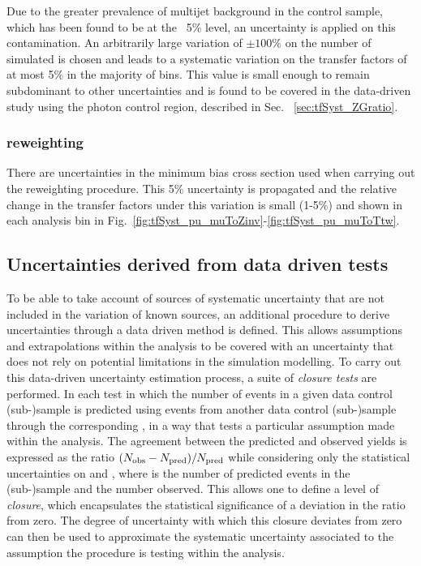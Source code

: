 Due to the greater prevalence of \QCD multijet background in the \gj
control sample, which has been found to be at the ~5\% level, an
uncertainty is applied on this contamination. An arbitrarily large
variation of $\pm 100\%$ on the number of simulated \QCD is chosen and
leads to a systematic variation on the transfer factors of at most 5\%
in the majority of bins. This value is small enough to remain
subdominant to other uncertainties and is found to be covered in the
data-driven study using the photon control region, described in Sec.
~\ref{sec:tfSyst_ZGratio}.

\subsubsection*{\PU reweighting}
\label{sec:tfSyst_pu}

There are uncertainties in the minimum bias cross section used when
carrying out the \PU reweighting procedure.  This 5\% uncertainty is
propagated and the relative change in the transfer factors under this
variation is small (1-5\%) and shown in each analysis bin in Fig.~\ref{fig:tfSyst_pu_muToZinv}-\ref{fig:tfSyst_pu_muToTtw}.

\subsection{Uncertainties derived from data driven tests}
\label{sec:closureTests}

To be able to take account of sources of systematic uncertainty that
are not included in the variation of known sources, an
additional procedure to derive uncertainties through a data driven
method is defined.  This allows assumptions and extrapolations
within the analysis to be covered with an uncertainty that does not
rely on potential limitations in the simulation modelling. To carry
out this data-driven uncertainty estimation process, a suite of
\emph{closure tests} are performed. In each test in which the number
of events in a given data control (sub-)sample is predicted using
events from another data control (sub-)sample through the
corresponding \TF, in a way that tests a particular assumption made
within the analysis.  The agreement between the predicted and observed
yields is expressed as the ratio $(N_{\textrm{obs}} - N_{\textrm{pred}})/N_{\textrm{pred}}$ while
considering only the statistical uncertainties on \npre and \nobs,
where \npre is the number of predicted events in the (sub-)sample and
\nobs the number observed.  This allows one to define a level of
\emph{closure}, which encapsulates the statistical significance of a
deviation in the ratio from zero. The degree of uncertainty with which
this closure deviates from zero can then be used to approximate the
systematic uncertainty associated to the assumption the procedure is
testing within the analysis.

